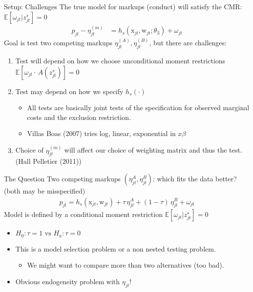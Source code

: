 \documentclass[aspectratio=169,10pt]{beamer}
\begin{document}
\begin{frame}{Setup: Challenges}
The true model for markups (conduct) will satisfy the CMR: $\mathbb{E}[\omega_{jt} | z_{jt}^s]=0$
\begin{align*}p_{jt} - \eta_{jt}^{(m)} &= h_s(\textrm{x}_{jt}, \textrm{w}_{jt}; \theta_3) + \omega_{jt}
\end{align*}
Goal is test two competing markups $\eta_{jt}^{(A)},\eta_{jt}^{(B)}$, but there are challenges:

\begin{enumerate}
\item Test will depend on how we choose \alert{unconditional moment restrictions} $\mathbb{E}[\omega_{jt} \cdot \, A(z_{jt}^s)]=0$

\item Test may depend on how we specify $h_s(\cdot)$
\begin{itemize}
\item All tests are basically joint tests of the specification for \alert{observed marginal costs} and the  \alert{exclusion restriction}.
\item Villas Boas (2007) tries log, linear, exponential in $x \beta $
\end{itemize}

\item Choice of $\eta_{jt}^{(m)}$ will affect our choice of \alert{weighting matrix} and thus the test. (Hall Pelletier (2011))
\end{enumerate}
\end{frame}




\begin{frame}{The Question}
Two competing markups $(\eta_{jt}^A, \eta_{jt}^B)$: which fits the data better?\\
(both may be misspecified)
\begin{align*}
p_{jt} = h_s(\textrm{x}_{jt},\textrm{w}_{jt}) + \tau\, \eta_{jt}^A + (1-\tau)\,\eta_{jt}^B + \omega_{jt}
\end{align*}
Model is defined by a conditional moment restriction $\mathbb{E}[\omega_{jt}  | z_{jt}^s]=0$
\begin{itemize}
\item $H_0: \tau =1 \text{ vs } H_a: \tau = 0$
\item This is a \alert{model selection} problem or a \alert{non nested testing} problem.
\begin{itemize}
\item We might want to compare more than two alternatives (too bad).
\end{itemize}
\item Obvious endogeneity problem with $\eta_{jt}$!
\end{itemize}
\end{frame}
\end{document}

